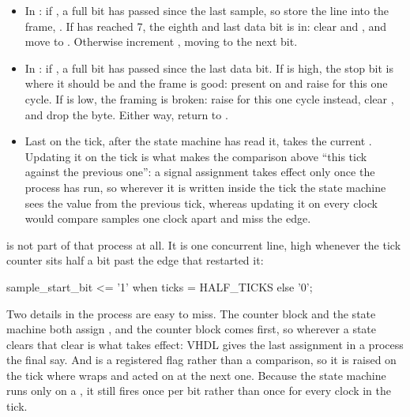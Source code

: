 \begin{itemize}
\begin{itemize}
      genuine, so clear  and move to . If  has gone high,
      the low was a glitch rather than a start, so return to . That mid-bit
      re-check is what rejects noise on an idle line.
    \item In \textbf{}: if , a full bit has passed since
      the last sample, so store the line into the frame, . If
       has reached 7, the eighth and last data bit is in: clear  and
      , and move to . Otherwise increment , moving to
      the next bit.
    \item In \textbf{}: if , a full bit has passed since the
      last data bit. If  is high, the stop bit is where it should be and the frame is
      good: present  on  and raise  for this one cycle. If
       is low, the framing is broken: raise  for this one cycle instead,
      clear , and drop the byte. Either way, return to .
    \item Last on the tick, after the state machine has read it,  takes the current
      . Updating it on the tick is what makes the comparison above ``this tick against the
      previous one'': a signal assignment takes effect only once the process has run, so wherever it
      is written inside the tick the state machine sees the value from the previous tick, whereas
      updating it on every clock would compare samples one clock apart and miss the edge.
  \end{itemize}
\end{itemize}

 is not part of that process at all. It is one concurrent line, high
whenever the tick counter sits half a bit past the edge that restarted it:

\begin{vhdlcode}
sample_start_bit <= '1' when ticks = HALF_TICKS else '0';
\end{vhdlcode}

\noindent Two details in the process are easy to miss. The counter block and the state machine both
assign , and the counter block comes first, so wherever a state clears  that
clear is what takes effect: VHDL gives the last assignment in a process the final say. And
 is a registered flag rather than a comparison, so it is raised on the tick where
 wraps and acted on at the next one. Because the state machine runs only on a
, it still fires once per bit rather than once for every clock in the tick.

